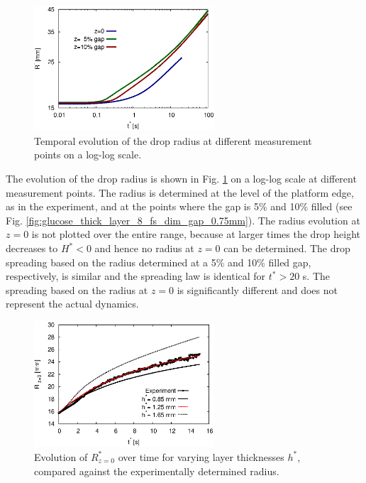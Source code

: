 \documentclass[aip,graphicx]{revtex4-1}
\begin{document}
\begin{figure}[!ht]
\centering
\includegraphics[width=0.6\textwidth]{figures/radius_vs_time_measure_pos_dim.eps}
\caption{Temporal evolution of the drop radius at different
  measurement points on a log-log scale.}
\label{fig:glucose_thick_layer_8_radius_vs_time_non_dim}
\end{figure}

The evolution of the drop radius is shown in Fig.
\ref{fig:glucose_thick_layer_8_radius_vs_time_non_dim} on a log-log
scale at different measurement points.  The radius is determined at
the level of the platform edge, as in the experiment, and at the
points where the gap is 5\% and 10\% filled (see Fig.
\ref{fig:glucose_thick_layer_8_fs_dim_gap_0.75mm}).  The radius
evolution at $z=0$ is not plotted over the entire range, because at
larger times the drop height decreases to $H^* < 0$ and hence no
radius at $z=0$ can be determined. The drop spreading based on the radius determined at a 5\%
and 10\% filled gap, respectively, is similar and the spreading law is
identical for $t^*>20$ s.  The spreading based on the radius at $z=0$
is significantly different and does not represent the actual dynamics.

\begin{figure}[!ht]
\centering
\includegraphics[width=0.6\textwidth]{figures/glucose_thick_layer_8_radius_vs_time_vary_layer.eps}
\caption{Evolution of $R^*_{z=0}$ over time for varying
  layer thicknesses $h^*$, compared against the experimentally
  determined radius.}
\label{fig:glucose_thick_layer_8_radius_vs_time_vary_layer}
\end{figure}
\end{document}
